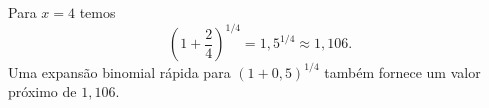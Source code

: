 Para $x=4$ temos
\[
\left(1+\frac{2}{4}\right)^{1/4} = 1{,}5^{1/4} \approx 1{,}106.
\]
Uma expansão binomial rápida para $(1+0{,}5)^{1/4}$ também fornece um valor próximo de $1{,}106$. 